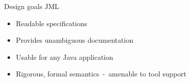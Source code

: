 \documentclass[final,nocolorBG,a4,marieke,nototal,pdf, accumulate,slideColor]{prosper}
\newcommand{\textttbf}[1]{\texttt{\textbf{#1}}}
\def \bsl       {\symbol{92}}
\begin{document}
\begin{slide}{Design goals JML}
\begin{itemize}
\item Readable specifications
\item Provides unambiguous documentation
\item Usable for any Java application
\item Rigorous, formal semantics~-~amenable to tool support
\end{itemize}
\end{slide}


\end{document}

